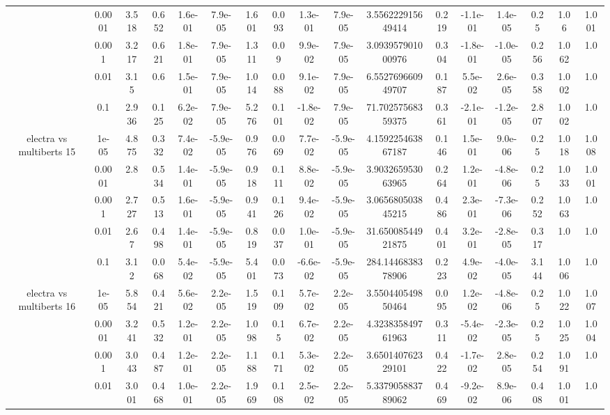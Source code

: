 \begin{tabular}{|c|c|c|c|c|c|c|c|c|c|c|c|c|c|c|c|c|}
 & 0.0001 & 3.518 & 0.652 & 1.6e-01 & 7.9e-05 & 1.601 & 0.093 & 1.3e-01 & 7.9e-05 & 3.556222915649414 & 0.219 & -1.1e-01 & 1.4e-05 & 0.25 & 1.06 & 1.001 \\
 & 0.001 & 3.217 & 0.621 & 1.8e-01 & 7.9e-05 & 1.311 & 0.09 & 9.9e-02 & 7.9e-05 & 3.093957901000976 & 0.304 & -1.8e-01 & -1.0e-05 & 0.256 & 1.062 & 1.0 \\
 & 0.01 & 3.15 & 0.6 & 1.5e-01 & 7.9e-05 & 1.014 & 0.088 & 9.1e-02 & 7.9e-05 & 6.552769660949707 & 0.187 & 5.5e-02 & 2.6e-05 & 0.358 & 1.002 & 1.0 \\
 & 0.1 & 2.936 & 0.125 & 6.2e-02 & 7.9e-05 & 5.276 & 0.101 & -1.8e-02 & 7.9e-05 & 71.70257568359375 & 0.361 & -2.1e-01 & -1.2e-05 & 2.807 & 1.002 & 1.0 \\
\hline
\multirow{5}{*}{electra  vs multiberts 15} & 1e-05 & 4.875 & 0.332 & 7.4e-02 & -5.9e-05 & 0.976 & 0.069 & 7.7e-02 & -5.9e-05 & 4.159225463867187 & 0.146 & 1.5e-01 & 9.0e-06 & 0.25 & 1.018 & 1.008 \\
 & 0.0001 & 2.8 & 0.534 & 1.4e-01 & -5.9e-05 & 0.918 & 0.111 & 8.8e-02 & -5.9e-05 & 3.903265953063965 & 0.264 & 1.2e-01 & -4.8e-06 & 0.25 & 1.033 & 1.001 \\
 & 0.001 & 2.727 & 0.513 & 1.6e-01 & -5.9e-05 & 0.941 & 0.126 & 9.4e-02 & -5.9e-05 & 3.065680503845215 & 0.486 & 2.3e-01 & -7.3e-06 & 0.252 & 1.063 & 1.0 \\
 & 0.01 & 2.67 & 0.498 & 1.4e-01 & -5.9e-05 & 0.819 & 0.037 & 1.0e-01 & -5.9e-05 & 31.65008544921875 & 0.401 & 3.2e-01 & -2.8e-05 & 0.317 & 1.0 & 1.0 \\
 & 0.1 & 3.12 & 0.068 & 5.4e-02 & -5.9e-05 & 5.401 & 0.073 & -6.6e-02 & -5.9e-05 & 284.1446838378906 & 0.223 & 4.9e-02 & -4.0e-05 & 3.144 & 1.006 & 1.0 \\
\hline
\multirow{5}{*}{electra  vs multiberts 16} & 1e-05 & 5.854 & 0.421 & 5.6e-02 & 2.2e-05 & 1.519 & 0.109 & 5.7e-02 & 2.2e-05 & 3.550440549850464 & 0.095 & 1.2e-02 & -4.8e-06 & 0.25 & 1.022 & 1.007 \\
 & 0.0001 & 3.241 & 0.532 & 1.2e-01 & 2.2e-05 & 1.098 & 0.15 & 6.7e-02 & 2.2e-05 & 4.323835849761963 & 0.311 & -5.4e-02 & -2.3e-05 & 0.25 & 1.025 & 1.004 \\
 & 0.001 & 3.043 & 0.487 & 1.2e-01 & 2.2e-05 & 1.188 & 0.171 & 5.3e-02 & 2.2e-05 & 3.650140762329101 & 0.422 & -1.7e-02 & 2.8e-05 & 0.254 & 1.091 & 1.0 \\
 & 0.01 & 3.001 & 0.468 & 1.0e-01 & 2.2e-05 & 1.969 & 0.108 & 2.5e-02 & 2.2e-05 & 5.337905883789062 & 0.469 & -9.2e-02 & 8.9e-06 & 0.408 & 1.001 & 1.0 \\

\end{tabular}
